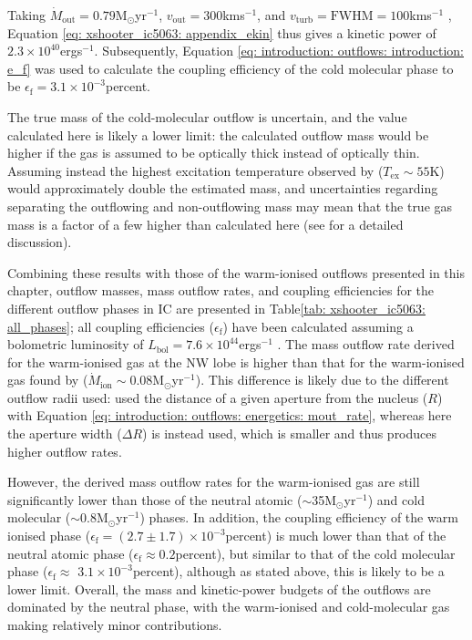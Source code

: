 Taking \mbox{$\dot{M}_\mathrm{out}=0.79$\;M$_\odot$\;yr$^{-1}$}, $v_\mathrm{out}=300$\;km\;s$^{-1}$, and $v_\mathrm{turb}=\mathrm{FWHM}=100$\;km\;s$^{-1}$ \citep{Morganti2015}, Equation \ref{eq: xshooter_ic5063: appendix_ekin} thus gives a kinetic power of $2.3\times10^{40}$\;erg\;s$^{-1}$. Subsequently, Equation \ref{eq: introduction: outflows: introduction: e_f} was used to calculate the coupling efficiency of the cold molecular phase to be $\epsilon_\mathrm{f}=3.1\times10^{-3}$\;per\;cent.

The true mass of the cold-molecular outflow is uncertain, and the value calculated here is likely a lower limit: the calculated outflow mass would be higher if the gas is assumed to be optically thick instead of optically thin. Assuming instead the highest excitation temperature observed by \citet{Oosterloo2017} ($T_\mathrm{ex}\sim55$\;K) would approximately double the estimated mass, and uncertainties regarding separating the outflowing and non-outflowing mass may mean that the true gas mass is a factor of a few higher than calculated here (see \citealt{Oosterloo2017} for a detailed discussion).

Combining these results with those of the warm-ionised outflows presented in this chapter, outflow masses, mass outflow rates, and coupling efficiencies for the different outflow phases in IC are presented in Table\;\ref{tab: xshooter_ic5063: all_phases}; all coupling efficiencies ($\epsilon_\mathrm{f}$) have been calculated assuming a bolometric luminosity of $L_\mathrm{bol}=7.6\times 10^{44}$\;erg\;s$^{-1}$ \citep{Nicastro2003, Morganti2007}. The mass outflow rate derived for the warm-ionised gas at the NW lobe is higher than that for the warm-ionised gas found by \citet{Morganti2007} ($\dot{M}_\mathrm{ion} \sim 0.08 $\;M$_\odot$\;yr$^{-1}$). This difference is likely due to the different outflow radii used: \citet{Morganti2007} used the distance of a given aperture from the nucleus ($R$) with Equation \ref{eq: introduction: outflows: energetics: mout_rate}, whereas here the aperture width ($\Delta R$) is instead used, which is smaller and thus produces higher outflow rates.

However, the derived mass outflow rates for the warm-ionised gas are still significantly lower than those of the neutral atomic ($\sim$35\;M$_{\odot}$\;yr$^{-1}$) and cold molecular ($\sim$0.8\;M$_{\odot}$\;yr$^{-1}$) phases. In addition, the coupling efficiency of the warm ionised phase (\mbox{$\epsilon_\mathrm{f}=(2.7\pm1.7)\times10^{-3}$\;per\;cent}) is much lower than that of the neutral atomic phase ($\epsilon_\mathrm{f}\approx0.2$\;per\;cent), but similar to that of the cold molecular phase ($\epsilon_\mathrm{f} \approx$ $3.1\times10^{-3}$\;per\;cent), although as stated above, this is likely to be a lower limit. Overall, the mass and kinetic-power budgets of the outflows are dominated by the neutral phase, with the warm-ionised and cold-molecular gas making relatively minor contributions.

